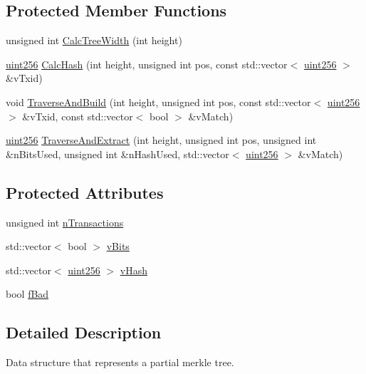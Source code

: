 \subsection*{Protected Member Functions}
\begin{DoxyCompactItemize}
\item 
unsigned int \mbox{\hyperlink{class_c_partial_merkle_tree_a7dd0288d62321fb5aa2c27a3372ee8fe}{Calc\+Tree\+Width}} (int height)
\item 
\mbox{\hyperlink{classuint256}{uint256}} \mbox{\hyperlink{class_c_partial_merkle_tree_a69e7771f95c498f6a340dcc227abcde4}{Calc\+Hash}} (int height, unsigned int pos, const std\+::vector$<$ \mbox{\hyperlink{classuint256}{uint256}} $>$ \&v\+Txid)
\item 
void \mbox{\hyperlink{class_c_partial_merkle_tree_a62bdcaf5b5ee6c6327ef67fb027a5fef}{Traverse\+And\+Build}} (int height, unsigned int pos, const std\+::vector$<$ \mbox{\hyperlink{classuint256}{uint256}} $>$ \&v\+Txid, const std\+::vector$<$ bool $>$ \&v\+Match)
\item 
\mbox{\hyperlink{classuint256}{uint256}} \mbox{\hyperlink{class_c_partial_merkle_tree_a3ddbe75a92d93059c30f6e60bacc7054}{Traverse\+And\+Extract}} (int height, unsigned int pos, unsigned int \&n\+Bits\+Used, unsigned int \&n\+Hash\+Used, std\+::vector$<$ \mbox{\hyperlink{classuint256}{uint256}} $>$ \&v\+Match)
\end{DoxyCompactItemize}
\subsection*{Protected Attributes}
\begin{DoxyCompactItemize}
\item 
unsigned int \mbox{\hyperlink{class_c_partial_merkle_tree_a0d3bd530f19f2c75c140a05c6f99782a}{n\+Transactions}}
\item 
std\+::vector$<$ bool $>$ \mbox{\hyperlink{class_c_partial_merkle_tree_a22a522d1fb8d449f4c91b65283339e7d}{v\+Bits}}
\item 
std\+::vector$<$ \mbox{\hyperlink{classuint256}{uint256}} $>$ \mbox{\hyperlink{class_c_partial_merkle_tree_a863cf9024be1b8fa97db08dfd6dbd687}{v\+Hash}}
\item 
bool \mbox{\hyperlink{class_c_partial_merkle_tree_a24bb0d9d17d6001dcfbca4d550c64ba3}{f\+Bad}}
\end{DoxyCompactItemize}


\subsection{Detailed Description}
Data structure that represents a partial merkle tree.

